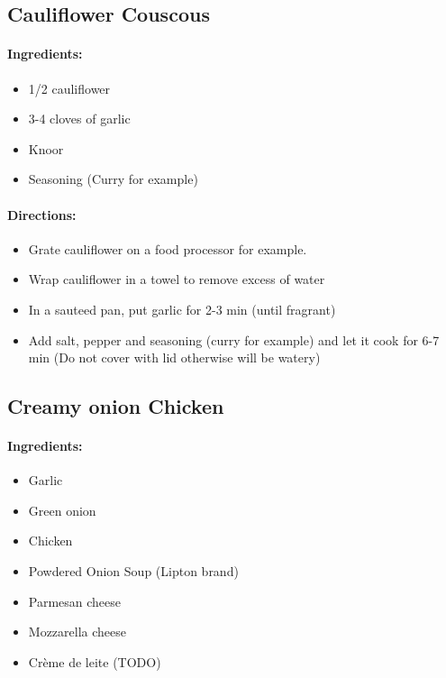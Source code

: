 \documentclass{article}
\begin{document}
\subsection{Cauliflower Couscous}

\paragraph{Ingredients:}

\begin{itemize}
	\item 1/2 cauliflower
	\item 3-4 cloves of garlic
	\item Knoor
	\item Seasoning (Curry for example)
\end{itemize}

\paragraph{Directions:}
\begin{itemize}
	\item Grate cauliflower on a food processor for example.
	\item Wrap cauliflower in a towel to remove excess of water
	\item In a sauteed pan, put garlic for 2-3 min (until fragrant)
	\item Add salt, pepper and seasoning (curry for example) and let it cook for 6-7 min (Do not cover with lid otherwise will be watery)
\end{itemize}

\subsection{Creamy onion Chicken}

\paragraph{Ingredients:}

\begin{itemize}
	\item Garlic 
	\item Green onion 
	\item Chicken 
	\item Powdered Onion Soup (Lipton brand) 
	\item Parmesan cheese 
	\item Mozzarella cheese 
	\item Crème de leite (TODO)
\end{itemize}
\end{document}
